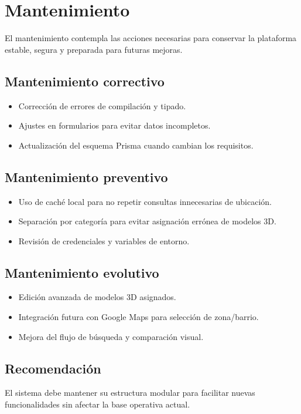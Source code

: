 \section{Mantenimiento}

El mantenimiento contempla las acciones necesarias para conservar la plataforma estable, segura y preparada para futuras mejoras.

\subsection{Mantenimiento correctivo}
\begin{itemize}[leftmargin=*]
    \item Correcci\'on de errores de compilaci\'on y tipado.
    \item Ajustes en formularios para evitar datos incompletos.
    \item Actualizaci\'on del esquema Prisma cuando cambian los requisitos.
\end{itemize}

\subsection{Mantenimiento preventivo}
\begin{itemize}[leftmargin=*]
    \item Uso de cach\'e local para no repetir consultas innecesarias de ubicaci\'on.
    \item Separaci\'on por categor\'ia para evitar asignaci\'on err\'onea de modelos 3D.
    \item Revisi\'on de credenciales y variables de entorno.
\end{itemize}

\subsection{Mantenimiento evolutivo}
\begin{itemize}[leftmargin=*]
    \item Edici\'on avanzada de modelos 3D asignados.
    \item Integraci\'on futura con Google Maps para selecci\'on de zona/barrio.
    \item Mejora del flujo de b\'usqueda y comparaci\'on visual.
\end{itemize}

\subsection{Recomendaci\'on}
El sistema debe mantener su estructura modular para facilitar nuevas funcionalidades sin afectar la base operativa actual.
